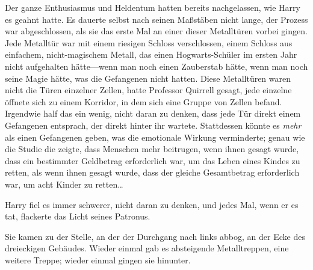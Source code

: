 Der ganze Enthusiasmus und Heldentum hatten bereits nachgelassen, wie Harry es geahnt hatte. Es dauerte selbst nach seinen Maßstäben nicht lange, der Prozess war abgeschlossen, als sie das erste Mal an einer dieser Metalltüren vorbei gingen. Jede Metalltür war mit einem riesigen Schloss verschlossen, einem Schloss aus einfachem, nicht-magischem Metall, das einen Hogwarts-Schüler im ersten Jahr nicht aufgehalten hätte—wenn man noch einen Zauberstab hätte, wenn man noch seine Magie hätte, was die Gefangenen nicht hatten. Diese Metalltüren waren nicht die Türen einzelner Zellen, hatte Professor Quirrell gesagt, jede einzelne öffnete sich zu einem Korridor, in dem sich eine Gruppe von Zellen befand. Irgendwie half das ein wenig, nicht daran zu denken, dass jede Tür direkt einem Gefangenen entsprach, der direkt hinter ihr wartete. Stattdessen könnte es \emph{mehr} als einen Gefangenen geben, was die emotionale Wirkung verminderte; genau wie die Studie die zeigte, dass Menschen mehr beitrugen, wenn ihnen gesagt wurde, dass ein bestimmter Geldbetrag erforderlich war, um das Leben eines Kindes zu retten, als wenn ihnen gesagt wurde, dass der gleiche Gesamtbetrag erforderlich war, um acht Kinder zu retten…

Harry fiel es immer schwerer, nicht daran zu denken, und jedes Mal, wenn er es tat, flackerte das Licht seines Patronus.

Sie kamen zu der Stelle, an der der Durchgang nach links abbog, an der Ecke des dreieckigen Gebäudes. Wieder einmal gab es absteigende Metalltreppen, eine weitere Treppe; wieder einmal gingen sie hinunter.


